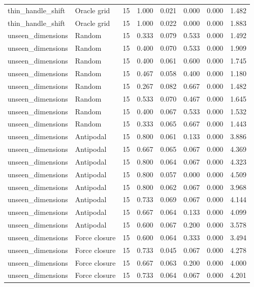 {\begin{longtable}{llrrrrrr}
thin\_handle\_shift & Oracle grid & 15 & 1.000 & 0.021 & 0.000 & 0.000 & 1.482 \\
thin\_handle\_shift & Oracle grid & 15 & 1.000 & 0.022 & 0.000 & 0.000 & 1.883 \\
unseen\_dimensions & Random & 15 & 0.333 & 0.079 & 0.533 & 0.000 & 1.492 \\
unseen\_dimensions & Random & 15 & 0.400 & 0.070 & 0.533 & 0.000 & 1.909 \\
unseen\_dimensions & Random & 15 & 0.400 & 0.061 & 0.600 & 0.000 & 1.745 \\
unseen\_dimensions & Random & 15 & 0.467 & 0.058 & 0.400 & 0.000 & 1.180 \\
unseen\_dimensions & Random & 15 & 0.267 & 0.082 & 0.667 & 0.000 & 1.482 \\
unseen\_dimensions & Random & 15 & 0.533 & 0.070 & 0.467 & 0.000 & 1.645 \\
unseen\_dimensions & Random & 15 & 0.400 & 0.067 & 0.533 & 0.000 & 1.532 \\
unseen\_dimensions & Random & 15 & 0.333 & 0.065 & 0.667 & 0.000 & 1.443 \\
unseen\_dimensions & Antipodal & 15 & 0.800 & 0.061 & 0.133 & 0.000 & 3.886 \\
unseen\_dimensions & Antipodal & 15 & 0.667 & 0.065 & 0.067 & 0.000 & 4.369 \\
unseen\_dimensions & Antipodal & 15 & 0.800 & 0.064 & 0.067 & 0.000 & 4.323 \\
unseen\_dimensions & Antipodal & 15 & 0.800 & 0.057 & 0.000 & 0.000 & 4.509 \\
unseen\_dimensions & Antipodal & 15 & 0.800 & 0.062 & 0.067 & 0.000 & 3.968 \\
unseen\_dimensions & Antipodal & 15 & 0.733 & 0.069 & 0.067 & 0.000 & 4.144 \\
unseen\_dimensions & Antipodal & 15 & 0.667 & 0.064 & 0.133 & 0.000 & 4.099 \\
unseen\_dimensions & Antipodal & 15 & 0.600 & 0.067 & 0.200 & 0.000 & 3.578 \\
unseen\_dimensions & Force closure & 15 & 0.600 & 0.064 & 0.333 & 0.000 & 3.494 \\
unseen\_dimensions & Force closure & 15 & 0.733 & 0.045 & 0.067 & 0.000 & 4.278 \\
unseen\_dimensions & Force closure & 15 & 0.667 & 0.063 & 0.200 & 0.000 & 4.000 \\
unseen\_dimensions & Force closure & 15 & 0.733 & 0.064 & 0.067 & 0.000 & 4.201 \\

\end{longtable}}
